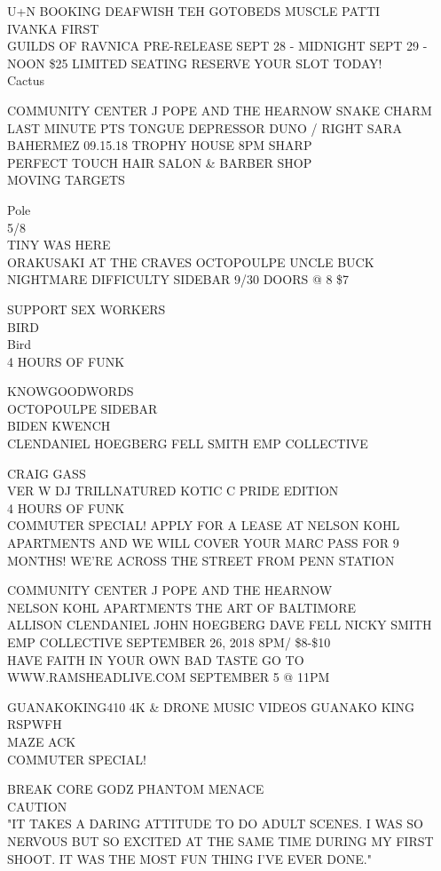 \documentclass[10pt,letterpaper]{article}
\begin{document}
U+N BOOKING DEAFWISH TEH GOTOBEDS MUSCLE PATTI\\
IVANKA FIRST\\
GUILDS OF RAVNICA PRE{-}RELEASE SEPT 28 {-} MIDNIGHT SEPT 29 {-} NOON \$25 LIMITED SEATING RESERVE YOUR SLOT TODAY!\\
Cactus

COMMUNITY CENTER J POPE AND THE HEARNOW SNAKE CHARM\\
LAST MINUTE PTS TONGUE DEPRESSOR DUNO / RIGHT SARA BAHERMEZ 09.15.18 TROPHY HOUSE 8PM SHARP\\
PERFECT TOUCH HAIR SALON \& BARBER SHOP\\
MOVING TARGETS

Pole\\
5/8\\
TINY WAS HERE\\
ORAKUSAKI AT THE CRAVES OCTOPOULPE UNCLE BUCK NIGHTMARE DIFFICULTY SIDEBAR 9/30 DOORS @ 8 \$7

SUPPORT SEX WORKERS\\
BIRD\\
Bird\\
4 HOURS OF FUNK

KNOWGOODWORDS\\
OCTOPOULPE SIDEBAR\\
BIDEN KWENCH\\
CLENDANIEL HOEGBERG FELL SMITH EMP COLLECTIVE

CRAIG GASS\\
VER W DJ TRILLNATURED KOTIC C PRIDE EDITION\\
4 HOURS OF FUNK\\
COMMUTER SPECIAL!  APPLY FOR A LEASE AT NELSON KOHL APARTMENTS AND WE WILL COVER YOUR MARC PASS FOR 9 MONTHS!  WE'RE ACROSS THE STREET FROM PENN STATION

COMMUNITY CENTER J POPE AND THE HEARNOW\\
NELSON KOHL APARTMENTS THE ART OF BALTIMORE\\
ALLISON CLENDANIEL JOHN HOEGBERG DAVE FELL NICKY SMITH EMP COLLECTIVE SEPTEMBER 26, 2018 8PM/ \$8{-}\$10\\
HAVE FAITH IN YOUR OWN BAD TASTE GO TO WWW.RAMSHEADLIVE.COM SEPTEMBER 5 @ 11PM

GUANAKOKING410 4K \& DRONE MUSIC VIDEOS GUANAKO KING\\
RSPWFH\\
MAZE ACK\\
COMMUTER SPECIAL!

BREAK CORE GODZ PHANTOM MENACE\\
CAUTION\\
"IT TAKES A DARING ATTITUDE TO DO ADULT SCENES.  I WAS SO NERVOUS BUT SO EXCITED AT THE SAME TIME DURING MY FIRST SHOOT.  IT WAS THE MOST FUN THING I'VE EVER DONE."
\
\end{document}
